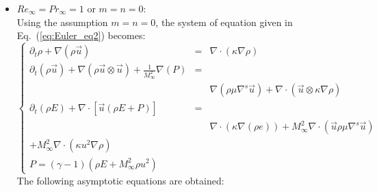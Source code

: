 \documentclass[preprint,10pt]{elsarticle}
\renewcommand{\div}{\vec{\nabla}\! \cdot \!}
\newcommand{\grad}{\vec{\nabla}}
\newcommand{\eqt}[1]{Eq.~(\ref{#1})}                     %
\begin{document}
\begin{itemize}
\item $Re_{\infty} = Pr_{\infty} = 1$ or $m=n=0$:\\
Using the assumption $m=n=0$, the system of equation given in \eqt{eq:Euler_eq2} becomes:
 \begin{equation}
\label{eq:Euler_eq2}
\left\{ 
\begin{array}{lll}
\partial_t \rho+ \nabla \left(  \rho \vec{u}  \right) &=& \nabla \cdot ( \kappa \nabla \rho )\\
\partial_t \left( \rho \vec{u} \right) + \nabla \left( \rho \vec{u}\otimes \vec{u} \right) + \frac{1}{M_{\infty}^2}\nabla \left( P \right) &=& \\
&&\nabla \left( \rho \mu \nabla^s \vec{u} \right) + \nabla \cdot (\vec{u}\otimes \kappa \nabla \rho )\\
\partial_t \left( \rho E \right) + \nabla \cdot \left[ \vec{u} \left( \rho E + P \right) \right] &=& \\
&&\nabla \cdot(\kappa \nabla(\rho e)) + M_{\infty}^2 \nabla \cdot \left( \vec{u} \rho \mu \nabla^s \vec{u} \right)  \\
+ M_{\infty}^2 \nabla \cdot (\kappa u^2 \nabla \rho) \\
P = \left( \gamma-1 \right) \left( \rho E + M_{\infty}^2 \rho u^2 \right)
\end{array}
\right.
\end{equation}
The following asymptotic equations are obtained:

\end{itemize}
\end{document}
